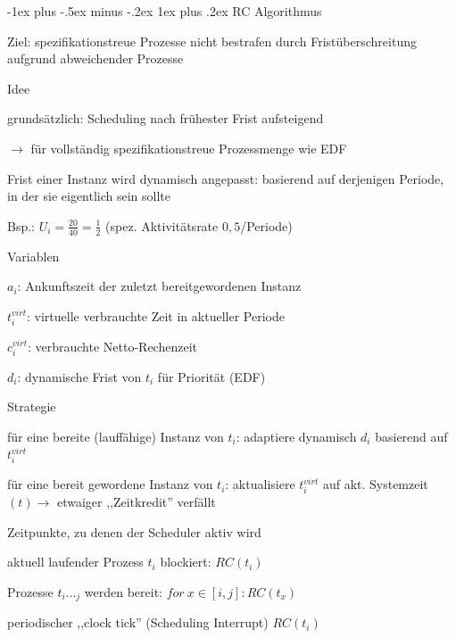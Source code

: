 \documentclass[a4paper]{article}
\makeatletter
\renewcommand{\subsubsection}{\@startsection{subsubsection}{3}{0mm}%
 {-1ex plus -.5ex minus -.2ex}%
 {1ex plus .2ex}%
 {\normalfont\small\bfseries}}
\makeatother
\begin{document}
\begin{multicols}{3}
    \subsubsection{RC Algorithmus}
    \begin{itemize*}
        \item Ziel: spezifikationstreue Prozesse nicht bestrafen durch Fristüberschreitung aufgrund abweichender Prozesse
        \item Idee
        \begin{itemize*}
            \item grundsätzlich: Scheduling nach frühester Frist aufsteigend
            \item[$\rightarrow$] für vollständig spezifikationstreue Prozessmenge wie EDF
            \item Frist einer Instanz wird dynamisch angepasst: basierend auf derjenigen Periode, in der sie eigentlich sein sollte%
            \item Bsp.: $U_i =\frac{20}{40}=\frac{1}{2}$ (spez. Aktivitätsrate $0,5$/Periode)
        \end{itemize*}
        \item Variablen
        \begin{itemize*}
            \item $a_i$: Ankunftszeit der zuletzt bereitgewordenen Instanz
            \item $t_i^{virt}$: virtuelle verbrauchte Zeit in aktueller Periode
            \item $c_i^{virt}$: verbrauchte Netto-Rechenzeit
            \item $d_i$: dynamische Frist von $t_i$ für Priorität (EDF)
        \end{itemize*}
        \item Strategie
        \begin{itemize*}
            \item für eine bereite (lauffähige) Instanz von $t_i$: adaptiere dynamisch $d_i$ basierend auf $t_i^{virt}$
            \item für eine bereit gewordene Instanz von $t_i$: aktualisiere $t_i^{virt}$ auf akt. Systemzeit $(t)\rightarrow$ etwaiger ,,Zeitkredit'' verfällt
        \end{itemize*}
        \item Zeitpunkte, zu denen der Scheduler aktiv wird
        \begin{itemize*}
            \item aktuell laufender Prozess $t_i$ blockiert:  $RC(t_i)$
            \item Prozesse $t_i..._j$ werden bereit:  $for\ x\in[i,j]: RC(t_x)$
            \item periodischer ,,clock tick'' (Scheduling Interrupt) $RC(t_i)$
        \end{itemize*}
    \end{itemize*}


\end{multicols}
\end{document}
